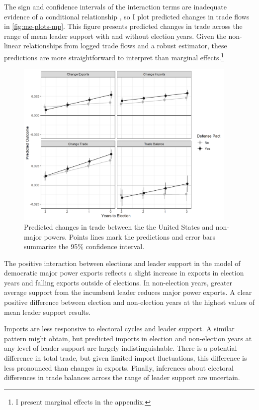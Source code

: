 \documentclass[12pt]{article}
\begin{document}
The sign and confidence intervals of the interaction terms are inadequate evidence of a conditional relationship \citep{BramborClarkGolder2006}, so I plot predicted changes in trade flows in \autoref{fig:me-plots-mp}.
This figure presents predicted changes in trade across the range of mean leader support with and without election years. 
Given the non-linear relationships from logged trade flows and a robust estimator, these predictions are more straightforward to interpret than marginal effects.\footnote{I present marginal effects in the appendix.} 


\begin{figure}[htpb]
	\centering
		\includegraphics[width=0.95\textwidth]{../figures/us-elec-pred.png}
	\caption{Predicted changes in trade between the the United States and non-major powers. Points lines mark the predictions and error bars summarize the 95\% confidence interval.}
	\label{fig:us-elec-pred}
\end{figure}


The positive interaction between elections and leader support in the model of democratic major power exports reflects a slight increase in exports in election years and falling exports outside of elections. 
In non-election years, greater average support from the incumbent leader reduces major power exports. 
A clear positive difference between election and non-election years at the highest values of mean leader support results. 


Imports are less responsive to electoral cycles and leader support. 
A similar pattern might obtain, but predicted imports in election and non-election years at any level of leader support are largely indistinguishable. 
There is a potential difference in total trade, but given limited import fluctuations, this difference is less pronounced than changes in exports. 
Finally, inferences about electoral differences in trade balances across the range of leader support are uncertain.
\end{document}
